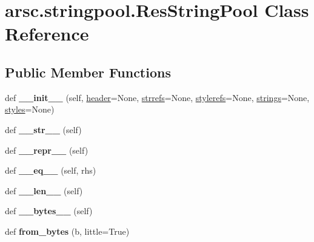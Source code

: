 \hypertarget{classarsc_1_1stringpool_1_1ResStringPool}{}\section{arsc.\+stringpool.\+Res\+String\+Pool Class Reference}
\label{classarsc_1_1stringpool_1_1ResStringPool}
\subsection*{Public Member Functions}
\begin{DoxyCompactItemize}
\item 
\mbox{\label{classarsc_1_1stringpool_1_1ResStringPool_adf8610e1abbb658616bc024fd77c7bf8}} 
def {\bfseries \+\_\+\+\_\+init\+\_\+\+\_\+} (self, \mbox{\hyperlink{classarsc_1_1stringpool_1_1ResStringPool_a8df057b196c2fbaf9a3a4eeeb3ff3357}{header}}=None, \mbox{\hyperlink{classarsc_1_1stringpool_1_1ResStringPool_a3188382e081e43e85d549297ec499ac2}{strrefs}}=None, \mbox{\hyperlink{classarsc_1_1stringpool_1_1ResStringPool_a7264bcbbfd5862a58240c29e9f4655a1}{stylerefs}}=None, \mbox{\hyperlink{classarsc_1_1stringpool_1_1ResStringPool_a04ef90c01b1a31b1e32936e431a2166d}{strings}}=None, \mbox{\hyperlink{classarsc_1_1stringpool_1_1ResStringPool_aa7ac2665b21f6bdd96bf4ed85f7d58ba}{styles}}=None)
\item 
\mbox{\label{classarsc_1_1stringpool_1_1ResStringPool_aded4ae4acdb27fc05fb11112b1406ab7}} 
def {\bfseries \+\_\+\+\_\+str\+\_\+\+\_\+} (self)
\item 
\mbox{\label{classarsc_1_1stringpool_1_1ResStringPool_a38713da2e81a1bf00b5d960f2cee6ce4}} 
def {\bfseries \+\_\+\+\_\+repr\+\_\+\+\_\+} (self)
\item 
\mbox{\label{classarsc_1_1stringpool_1_1ResStringPool_a9138a62791b2f6c86898b0d9e2e8cb96}} 
def {\bfseries \+\_\+\+\_\+eq\+\_\+\+\_\+} (self, rhs)
\item 
\mbox{\label{classarsc_1_1stringpool_1_1ResStringPool_a9c1372cf1e1a0978b649c3edd0203417}} 
def {\bfseries \+\_\+\+\_\+len\+\_\+\+\_\+} (self)
\item 
\mbox{\label{classarsc_1_1stringpool_1_1ResStringPool_ae81de86d622c9a80ddbddbc94e6cf14d}} 
def {\bfseries \+\_\+\+\_\+bytes\+\_\+\+\_\+} (self)
\item 
\mbox{\label{classarsc_1_1stringpool_1_1ResStringPool_ac9aef78bfa1159f62a1debb84911411f}} 
def {\bfseries from\+\_\+bytes} (b, little=True)
\end{DoxyCompactItemize}
